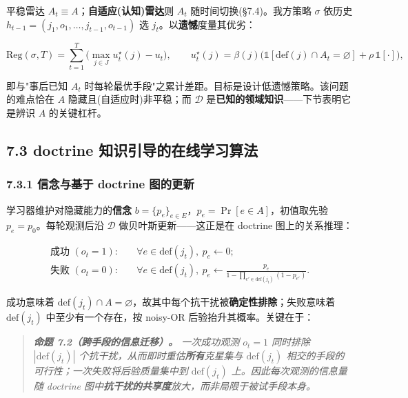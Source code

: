 \documentclass[12pt,a4paper]{ctexart}
\begin{document}
平稳雷达 $A_t\equiv A$；\textbf{自适应(认知)雷达}则 $A_t$ 随时间切换(§7.4)。我方策略 $\sigma$ 依历史 $h_{t-1}=(j_1,o_1,\dots,j_{t-1},o_{t-1})$ 选 $j_t$。以\textbf{遗憾}度量其优劣：

\[\mathrm{Reg}(\sigma,T)=\sum_{t=1}^{T}\Big(\max_{j\in J}u^\star_t(j)-u_t\Big),\qquad u^\star_t(j)=\beta(j)\big(\mathbb{1}[\mathrm{def}(j)\cap A_t=\varnothing]+\rho\,\mathbb{1}[\cdot]\big),\]

即与"事后已知 $A_t$ 时每轮最优手段"之累计差距。目标是设计低遗憾策略。该问题的难点恰在 $A$ 隐藏且(自适应时)非平稳；而 $\mathcal{D}$ 是\textbf{已知的领域知识}——下节表明它是辨识 $A$ 的关键杠杆。


\subsection*{7.3 doctrine 知识引导的在线学习算法}

\subsubsection*{7.3.1 信念与基于 doctrine 图的更新}

学习器维护对隐藏能力的\textbf{信念} $b=\{p_e\}_{e\in E}$，$p_e=\Pr[e\in A]$，初值取先验 $p_e=p_0$。每轮观测后沿 $\mathcal{D}$ 做贝叶斯更新——这正是在 doctrine 图上的关系推理：

\[\begin{aligned}
\textbf{成功 } (o_t=1):&\quad \forall e\in\mathrm{def}(j_t),\ p_e\leftarrow 0;\\[2pt]
\textbf{失败 } (o_t=0):&\quad \forall e\in\mathrm{def}(j_t),\ p_e\leftarrow \frac{p_e}{1-\prod_{e'\in\mathrm{def}(j_t)}(1-p_{e'})}.
\end{aligned}\]

成功意味着 $\mathrm{def}(j_t)\cap A=\varnothing$，故其中每个抗干扰被\textbf{确定性排除}；失败意味着 $\mathrm{def}(j_t)$ 中至少有一个存在，按 noisy-OR 后验抬升其概率。关键在于：

\begin{quote}\itshape \textbf{命题 7.2（跨手段的信息迁移）。} 一次成功观测 $o_t=1$ 同时排除 $|\mathrm{def}(j_t)|$ 个抗干扰，从而即时重估\textbf{所有}克星集与 $\mathrm{def}(j_t)$ 相交的手段的可行性；一次失败将后验质量集中到 $\mathrm{def}(j_t)$ 上。因此每次观测的信息量随 doctrine 图中\textbf{抗干扰的共享度}放大，而非局限于被试手段本身。\end{quote}
\end{document}
